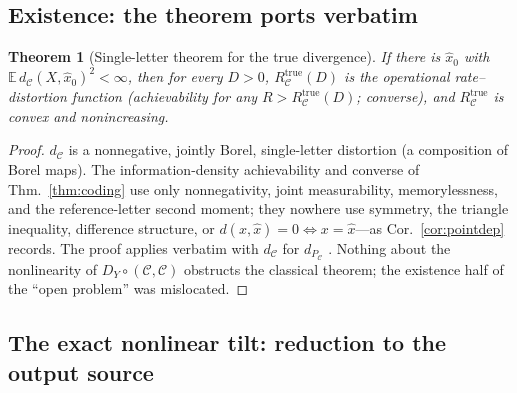 \documentclass[lettersize,onecolumn]{IEEEtran}
\newtheorem{theorem}{Theorem}
\theoremstyle{definition}
\theoremstyle{remark}
\newcommand{\PC}{P_{\mathcal{C}}}
\newcommand{\E}{\mathbb{E}}
\begin{document}
\subsection{Existence: the theorem ports verbatim}

\begin{theorem}[Single-letter theorem for the true divergence]\label{thm:B1}
If there is $\hat x_0$ with $\E\,d_{\mathcal{C}}(X,\hat x_0)^2<\infty$, then for every
$D>0$, $R_{\mathcal{C}}^{\mathrm{true}}(D)$ is the operational rate--distortion
function (achievability for any $R>R_{\mathcal{C}}^{\mathrm{true}}(D)$; converse), and
$R_{\mathcal{C}}^{\mathrm{true}}$ is convex and nonincreasing.
\end{theorem}
\begin{proof}
$d_{\mathcal{C}}$ is a nonnegative, jointly Borel, single-letter distortion (a
composition of Borel maps). The information-density achievability and converse of
Thm.~\ref{thm:coding} use only nonnegativity, joint measurability, memorylessness, and
the reference-letter second moment; they nowhere use symmetry, the triangle
inequality, difference structure, or $d(x,\hat x)=0\iff x=\hat x$---as
Cor.~\ref{cor:pointdep} records. The proof applies verbatim with $d_{\mathcal{C}}$ for
$d_{\PC}$ \cite{csiszar1974}. Nothing about the nonlinearity of
$D_Y\circ(\mathcal{C},\mathcal{C})$ obstructs the classical theorem; the existence half
of the ``open problem'' was mislocated.
\end{proof}

\subsection{The exact nonlinear tilt: reduction to the output source}
\end{document}

